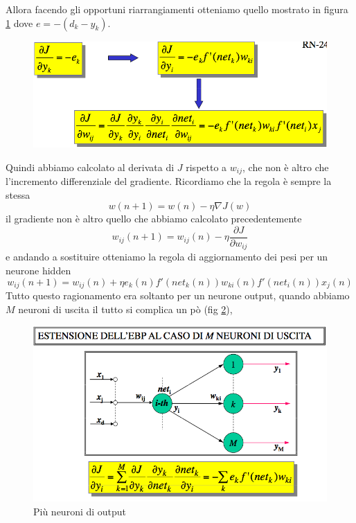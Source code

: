 Allora facendo gli opportuni riarrangiamenti otteniamo quello mostrato in figura \ref{hp2} dove $e  = -(d_k - y_k)$.
\begin{figure}
\centering
\includegraphics[scale=0.5]{img/hp2.png}
\caption{}
\label{hp2}
\end{figure}
\noindent Quindi abbiamo calcolato al derivata di $J$ rispetto a $w_{ij}$, che non è altro che l'incremento differenziale del gradiente. Ricordiamo che la regola è sempre la stessa
\begin{equation}
w(n+1) = w(n) - \eta \nabla J(w)
\end{equation}
il gradiente non è altro quello che abbiamo calcolato precedentemente
\begin{equation}
w_{ij}(n+1) = w_{ij}(n) - \eta \frac{\partial J}{\partial w_{ij}}
\end{equation}
e andando a sostituire otteniamo la regola di aggiornamento dei pesi per un neurone hidden 
\begin{equation}
w_{ij}(n+1) = w_{ij}(n) + \eta e_k(n) f'(net_k(n)) w_{ki}(n) f'(net_i(n)) x_j(n)
\end{equation}
Tutto questo ragionamento era soltanto per un neurone output, quando abbiamo $M$ neuroni di uscita il tutto si complica un pò (fig \ref{hp3}),
\begin{figure}
\centering
\includegraphics[scale=0.5]{img/hp3.png}
\caption{Più neuroni di output}
\label{hp3}
\end{figure}
